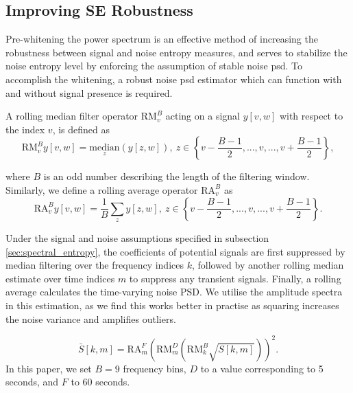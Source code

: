 {%

\subsection{Improving SE Robustness}

Pre-whitening the power spectrum is an effective method of increasing the robustness between signal and noise entropy measures, and serves to stabilize the noise entropy level by enforcing the assumption of stable noise \ac{psd}. To accomplish the whitening, a robust noise \ac{psd} estimator which can function with and without signal presence is required. 

A rolling median filter operator $\text{RM}_v^B$ acting on a signal $y[v, w]$ with respect to the index $v$, is defined as
\begin{equation}
    \text{RM}_v^B y[v, w] = \underset{z}{\text{median}}(y[z,w]), \ z \in \left\{v - \frac{B-1}{2}, ..., v, ..., v + \frac{B-1}{2}\right\},
\end{equation}

\noindent where $B$ is an odd number describing the length of the filtering window. Similarly, we define a rolling average operator $\text{RA}_v^B$ as
\begin{equation}
    \text{RA}_v^B y[v, w] = \frac{1}{B}\sum_z y[z,w], \ z \in \left\{v - \frac{B-1}{2}, ..., v, ..., v + \frac{B-1}{2}\right\}.
\end{equation}

Under the signal and noise assumptions specified in subsection \ref{sec:spectral_entropy}, the coefficients of potential signals are first suppressed by median filtering over the frequency indices $k$, followed by another rolling median estimate over time indices $m$ to suppress any transient signals. Finally, a rolling average calculates the time-varying noise PSD. We utilise the amplitude spectra in this estimation, as we find this works better in practise as squaring increases the noise variance and amplifies outliers.

\begin{equation}
\label{eqn:psdestimate}
    \bar{S}[k, m] = \text{RA}_m^{F} \left( \text{RM}_m^{D} \left(\text{RM}_k^{B} \sqrt{S[k,m]}\right) \right)^2.
\end{equation}
In this paper, we set $B=9$ frequency bins, $D$ to a value corresponding to 5 seconds, and $F$ to 60 seconds. 

}
